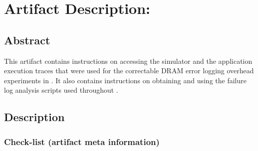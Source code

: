 
\clearpage
\appendix
\section{Artifact Description: }
\label{sec:appendix}



\subsection{Abstract}

This artifact contains instructions on accessing the \LogGOPSim simulator and
the application execution traces that were used for the correctable DRAM error 
logging overhead experiments in . 
It also contains instructions on obtaining and using the failure log analysis
scripts used throughout .

\subsection{Description}

\subsubsection{Check-list (artifact meta information)}


